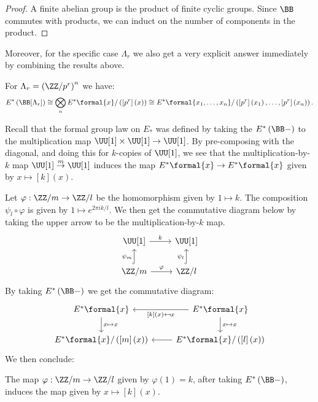 \begin{proof}
	A finite abelian group is the product of finite cyclic groups.
	Since $\BB$ commutes with products, we can induct on the number of components in the product.
\end{proof}

Moreover, for the specific case $\Lambda_r$ we also get a very explicit answer immediately by combining the results above.

\begin{proposition}\label{E-B-lambda-r}
	For $\Lambda_r = \left(\ZZ/{p^r}\right)^n$ we have:
	$$
	E^*\left(\BB[\Lambda_r]\right)
	\cong \bigotimes_n E^*\formal{x}/\left(\left[p^r\right]\left(x\right)\right)
	\cong E^*\formal{x_1, \dotsc, x_n}/\left(\left[p^r\right]\left(x_1\right), \dotsc, \left[p^r\right]\left(x_n\right)\right).
	$$
\end{proposition}

Recall that the formal group law on $E_*$ was defined by taking the $E^*\left(\BB-\right)$ to the multiplication map $\UU[1] \times \UU[1] \to \UU[1]$.
By pre-composing with the diagonal, and doing this for $k$-copies of $\UU[1]$, we see that the multiplication-by-$k$ map $\UU[1] \overset{m}{\to} \UU[1]$ induces the map $E^*\formal{x} \to E^*\formal{x}$ given by $x \mapsto \left[k\right]\left(x\right)$.

Let $\varphi: \ZZ/m \to \ZZ/l$ be the homomorphism given by $1 \mapsto k$.
The composition $\psi_l \circ \varphi$ is given by $1 \mapsto e^{2\pi ik/l}$.
We then get the commutative diagram below by taking the upper arrow to be the multiplication-by-$k$ map.
$$
\begin{tikzcd}
	\UU[1] \arrow{r}{k} & \UU[1] \\
	\ZZ/m \arrow[hook]{u}{\psi_m} \arrow{r}{\varphi} & \ZZ/l \arrow[hook]{u}{\psi_l}
\end{tikzcd}
$$
By taking $E^*\left(\BB-\right)$ we get the commutative diagram:
$$
\begin{tikzcd}
	E^*\formal{x} \arrow{d}{x \mapsto x} & E^*\formal{x} \arrow{d}{x \mapsto x} \arrow{l}{[k]\left(x\right) \mapsfrom x} \\
	E^*\formal{x}/\left(\left[m\right]\left(x\right)\right) & E^*\formal{x}/\left(\left[l\right]\left(x\right)\right) \arrow{l}{}
\end{tikzcd}
$$
We then conclude:

\begin{proposition}\label{E-B-map-cyclic}
	The map $\varphi: \ZZ/m \to \ZZ/l$ given by $\varphi\left(1\right) = k$, after taking $E^*\left(\BB-\right)$, induces the map given by $x \mapsto [k]\left(x\right)$.
\end{proposition}

